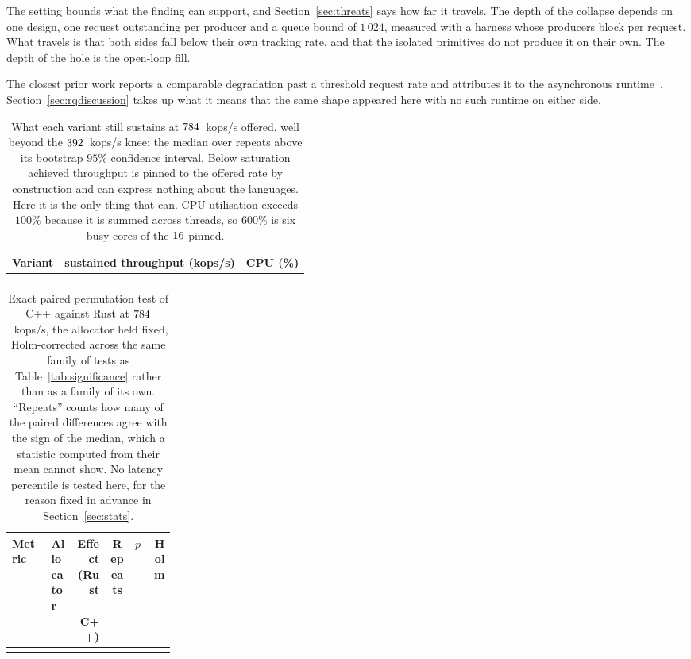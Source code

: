 \documentclass[english,oneside,a4paper,censored,csm,software-track-2020]{HYthesisML}
\begin{document}
The setting bounds what the finding can support, and Section~\ref{sec:threats} says how far it
travels. The depth of the collapse depends on one design, one request outstanding per producer and
a queue bound of $1\,024$, measured with a harness whose producers block per request. What travels is that both sides fall below their own tracking rate, and that the isolated primitives do not produce
it on their own. The depth of the hole is the open-loop fill.

The closest prior work reports a comparable degradation past a threshold request rate and
attributes it to the asynchronous runtime~\cite{arvidsson2025async}.
Section~\ref{sec:rqdiscussion} takes up what it means that the same shape appeared here with no
such runtime on either side.

\begin{table}[H]
\centering
\small
\caption[What each variant sustains past saturation]{What each variant still sustains at
$784$~kops/s offered, well beyond the $392$~kops/s knee: the median over
\NRepeats{} repeats above its bootstrap $95\%$ confidence interval. Below saturation achieved
throughput is pinned to the offered rate by construction and can express nothing about the
languages. Here it is the only thing that can. CPU utilisation exceeds $100\%$ because it is
summed across threads, so $600\%$ is six busy cores of the $16$
pinned.\label{tab:overload}}
\begin{tabular}{@{}l r r@{}}
\hline\hline
Variant & sustained throughput (kops/s) & CPU (\%) \\
\hline
\\
\hline
\end{tabular}
\end{table}

\begin{table}[H]
\centering
\small
\caption[Exact paired test past saturation]{Exact paired permutation test of C++ against Rust at
$784$~kops/s, the allocator held fixed, Holm-corrected across the same family of
\NTests{} tests as Table~\ref{tab:significance} rather than as a family of its own. ``Repeats''
counts how many of the \NRepeats{} paired differences agree with the sign of the median, which a
statistic computed from their mean cannot show. No latency percentile is tested here, for the
reason fixed in advance in Section~\ref{sec:stats}.\label{tab:overloadtest}}
\setlength{\tabcolsep}{4pt}
\begin{tabular}{@{}p{0.24\linewidth} l r c r r@{}}
\hline\hline
Metric & Allocator & Effect (Rust $-$ C++) & Repeats & $p$ & Holm \\
\hline
\\
\hline
\end{tabular}
\end{table}
\end{document}
